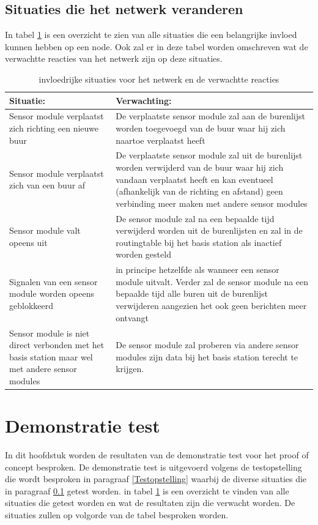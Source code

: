 \documentclass[a4paper, 11pt]{article}
\begin{document}
\subsection{Situaties die het netwerk veranderen} \label{SituatieOmschrijving}
In tabel \ref{Situaties} is een overzicht te zien van alle situaties die een belangrijke invloed kunnen hebben op een node. Ook zal er in deze tabel worden omschreven wat de verwachtte reacties van het netwerk zijn op deze situaties.
\begin{table}[ht]
	\centering
	\caption{invloedrijke situaties voor het netwerk en de verwachtte reacties}
	\begin{tabular}{ | m{6cm} | m{6cm}| } 
		\hline
		\textbf{Situatie:} & \textbf{Verwachting:} \\
		\hline
		Sensor module verplaatst zich richting een nieuwe buur & De verplaatste sensor module zal aan de burenlijst worden toegevoegd van de buur waar hij zich naartoe verplaatst heeft
		\\
		\hline
		Sensor module verplaatst zich van een buur af & De verplaatste sensor module zal uit de burenlijst worden verwijderd van de buur waar hij zich vandaan verplaatst heeft en kan eventueel (afhankelijk van de richting en afstand) geen verbinding meer maken met andere sensor modules
		\\
		\hline
		Sensor module valt opeens uit  & De sensor module zal na een bepaalde tijd verwijderd worden uit de burenlijsten en zal in de routingtable bij het basis station als inactief worden gesteld
		\\ 
		\hline
		Signalen van een sensor module worden opeens geblokkeerd & in principe hetzelfde als wanneer een sensor module uitvalt. Verder zal de sensor module na een bepaalde tijd alle buren uit de burenlijst verwijderen aangezien het ook geen berichten meer ontvangt
		\\ 
		\hline
		Sensor module is niet direct verbonden met het basis station maar wel met andere sensor modules & De sensor module zal proberen via andere sensor modules zijn data bij het basis station terecht te krijgen.
		\\
		\hline
	\end{tabular} 
	\label{Situaties}
\end{table}

\section{Demonstratie test}
In dit hoofdstuk worden de resultaten van de demonstratie test voor het proof of concept besproken. De demonstratie test is uitgevoerd volgens de testopstelling die wordt besproken in paragraaf \ref{Testopstelling} waarbij de diverse situaties die in paragraaf \ref{SituatieOmschrijving} getest worden. in tabel \ref{Situaties} is een overzicht te vinden van alle situaties die getest worden en wat de resultaten zijn die verwacht worden. De situaties zullen op volgorde van de tabel besproken worden.
\end{document}
